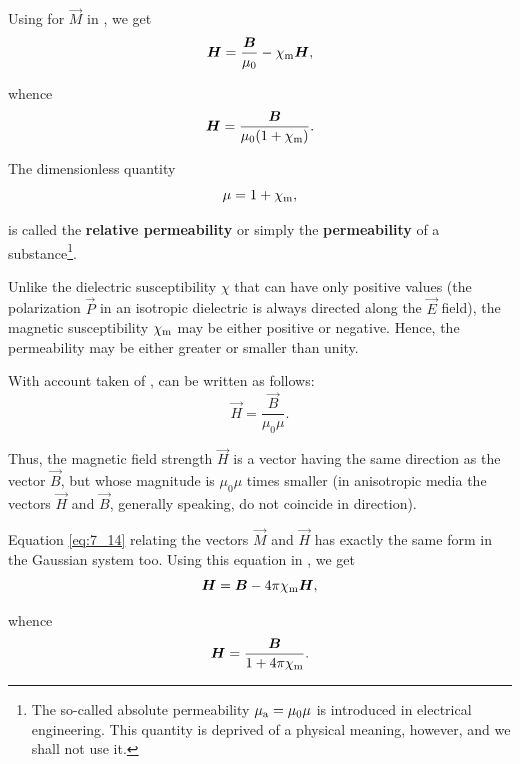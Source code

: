 Using  for $\vec{M}$ in , we get
\begin{equation*}
    \boldsymbol{H} = \frac{\boldsymbol{B}}{\mu_0} - \chi_{\text{m}} \boldsymbol{H},
\end{equation*}

\noindent
whence
\begin{equation}\label{eq:7_15}
    \boldsymbol{H} = \frac{\boldsymbol{B}}{\mu_0 (1 + \chi_{\text{m}})}.
\end{equation}

The dimensionless quantity
\begin{equation}\label{eq:7_16}
    \mu = 1 + \chi_{\text{m}},
\end{equation}

\noindent
is called the \textbf{relative permeability} or simply the \textbf{permeability} of a substance\footnote{The so-called absolute permeability $\mu_{\text{a}}=\mu_0\mu$ is introduced in electrical engineering. This quantity is deprived of a physical meaning, however, and we shall not use it.}.

Unlike the dielectric susceptibility $\chi$ that can have only positive values (the polarization $\vec{P}$ in an isotropic dielectric is always directed along the $\vec{E}$ field), the magnetic susceptibility $\chi_{\text{m}}$ may be either positive or negative.
Hence, the permeability may be either greater or smaller than unity.

With account taken of ,  can be written as follows:
\begin{equation}\label{eq:7_17}
    \vec{H} = \frac{\vec{B}}{\mu_0\mu}.
\end{equation}

\noindent
Thus, the magnetic field strength $\vec{H}$ is a vector having the same direction as the vector $\vec{B}$, but whose magnitude is $\mu_0\mu$ times smaller (in anisotropic media the vectors $\vec{H}$ and $\vec{B}$, generally speaking, do not coincide in direction).

Equation \eqref{eq:7_14} relating the vectors $\vec{M}$ and $\vec{H}$ has exactly the same form in the Gaussian system too.
Using this equation in , we get
\begin{equation*}
    \boldsymbol{H} = \boldsymbol{B} - 4\pi\chi_{\text{m}} \boldsymbol{H},
\end{equation*}

\noindent
whence
\begin{equation}\label{eq:7_18}
    \boldsymbol{H} = \frac{\boldsymbol{B}}{1 + 4\pi\chi_{\text{m}}}.
\end{equation}

